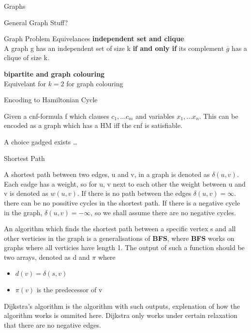 \documentclass[12pt, letterpaper]{article}
\begin{document}
\begin{section}{Graphs}
\begin{subsection}{General Graph Stuff?}
\begin{subsubsection}{Graph Problem Equivelances}
      \textbf{independent set and clique} \\
      A graph g has an independent set of size k \textbf{if and only if}
      its complement \(\overline{g}\) has a clique of size k.

      \textbf{bipartite and graph colouring} \\
      Equivelant for \(k = 2\) for graph colouring

    \end{subsubsection}

    \begin{subsubsection}{Encoding to Hamiltonian Cycle}

      Given a cnf-formula f which clauses \(c_{1}, \dots c_{m}\) and variables
      \(x_{1}, \dots x_{n}\). This can be encoded as a graph which has a HM iff
      the cnf is satisfiable.

      A choice gadged exists \ldots

    \end{subsubsection}

  \end{subsection}

  \begin{subsection}{Shortest Path}

    A shortest path between two edges, u and v, in a graph is denoted
    as \(\delta(u, v)\). Each eadge has a weight, so for u, v next to each other
    the weight between u and v is denoted as \(w(u, v)\).
    If there is no path between the edges \(\delta(u, v) = \infty\).
    there can be no possitive cycles in the shortest path.
    If there is a negative cycle in the graph, \(\delta(u, v) = -\infty\), so
    we shall assume there are no negative cycles.

    An algorithm which finds the shortest path between a specific vertex s
    and all other verticies in the graph is a generalisations of
    \textbf{BFS}, where \textbf{BFS} works on graphs
    where all verticies have length 1.
    The output of such a function should be two arrays, denoted as d and \(\pi\)
    where
    \begin{itemize}
      \item \(d(v) = \delta(s, v)\)
      \item \(\pi(v)\) is the predecessor of v
    \end{itemize}
    Dijkstra's algorithm is the algorithm with such outputs, explenation of
    how the algorithm works is ommited here. Dijkstra only works under certain
    relaxation that there are no negative edges.


\end{subsection}
\end{section}
\end{document}
